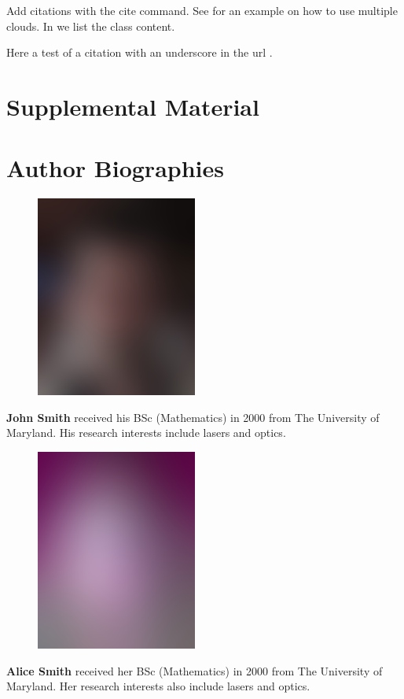 \documentclass[9pt,twocolumn,twoside]{styles/osajnl}
\begin{document}
\noindent Add citations with the cite command. See
\cite{las14cloudmeshmultiple} for an example on how to use multiple
clouds. In \cite{www-i524} we list the class content.

Here a test of a citation with an underscore in the url \cite{www-underscore}.

\section{Supplemental Material}



 
\section*{Author Biographies}
\begingroup
\setlength\intextsep{0pt}
\begin{minipage}[t][3.2cm][t]{1.0\columnwidth} %
  \begin{figure}
    \includegraphics[width=0.25\columnwidth]{images/john_smith.eps}
  \end{figure}
  \noindent
  {\bfseries John Smith} received his BSc (Mathematics) in 2000 from
  The University of Maryland. His research interests include lasers
  and optics. 
\end{minipage}
\begin{minipage}[t][3.2cm][t]{1.0\columnwidth} %
  \begin{figure}
    \includegraphics[width=0.25\columnwidth]{images/alice_smith.eps}
  \end{figure}
  \noindent
  {\bfseries Alice Smith} received her BSc (Mathematics) in 2000 from
  The University of Maryland. Her research interests also include
  lasers and optics. 
\end{minipage}
\end{document}

